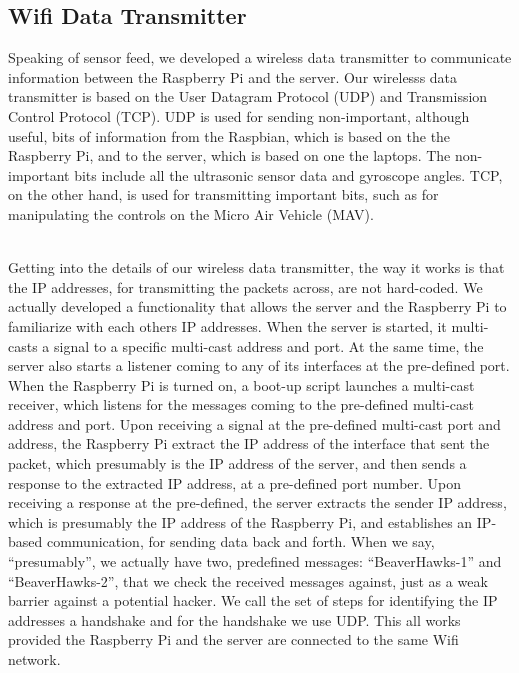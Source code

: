 \documentclass[onecolumn, oneside, letterpaper, draftclsnofoot, 10pt, compsoc]{IEEEtran}
\begin{document}

\subsection{Wifi Data Transmitter}
\noindent
Speaking of sensor feed, we developed a wireless data transmitter to communicate information between the Raspberry Pi and the server. Our wirelesss data transmitter is based on the User Datagram Protocol (UDP) and Transmission Control Protocol (TCP). UDP is used for sending non-important, although useful, bits of information from the Raspbian, which is based on the the Raspberry Pi, and to the server, which is based on one the laptops. The non-important bits include all the ultrasonic sensor data and gyroscope angles. TCP, on the other hand, is used for transmitting important bits, such as for manipulating the controls on the Micro Air Vehicle (MAV).

\noindent \\
Getting into the details of our wireless data transmitter, the way it works is that the IP addresses, for transmitting the packets across, are not hard-coded. We actually developed a functionality that allows the server and the Raspberry Pi to familiarize with each others IP addresses. When the server is started, it multi-casts a signal to a specific multi-cast address and port. At the same time, the server also starts a listener coming to any of its interfaces at the pre-defined port. When the Raspberry Pi is turned on, a boot-up script launches a multi-cast receiver, which listens for the messages coming to the pre-defined multi-cast address and port. Upon receiving a signal at the pre-defined multi-cast port and address, the Raspberry Pi extract the IP address of the interface that sent the packet, which presumably is the IP address of the server, and then sends a response to the extracted IP address, at a pre-defined port number. Upon receiving a response at the pre-defined, the server extracts the sender IP address, which is presumably the IP address of the Raspberry Pi, and establishes an IP-based communication, for sending data back and forth. When we say, ``presumably'', we actually have two, predefined messages: ``BeaverHawks-1'' and ``BeaverHawks-2'', that we check the received messages against, just as a weak barrier against a potential hacker. We call the set of steps for identifying the IP addresses a handshake and for the handshake we use UDP. This all works provided the Raspberry Pi and the server are connected to the same Wifi network.
\end{document}
